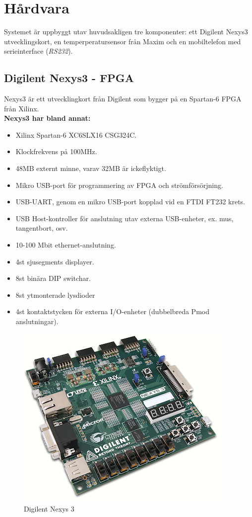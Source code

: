 \section{Hårdvara}\label{sec:hårdvara}
	Systemet är uppbyggt utav huvudsakligen tre komponenter: ett Digilent Nexys3 utvecklingskort, en
	temperperatursensor från Maxim och en mobiltelefon med serieinterface (\emph{RS232}).

	\subsection{Digilent Nexys3 - FPGA}
		Nexys3 är ett utvecklingkort från Digilent som bygger på en Spartan-6 FPGA från Xilinx.
		\\
		\textbf{Nexys3 har bland annat:}
		\begin{itemize}
			\item Xilinx Spartan-6 XC6SLX16 CSG324C.
			\item Klockfrekvens på 100MHz.
			\item 48MB externt minne, varav 32MB är ickeflyktigt.
			\item Mikro USB-port för programmering av FPGA och strömförsörjning.
			\item USB-UART, genom en mikro USB-port kopplad vid en FTDI FT232 krets.
			\item USB Host-kontroller för anslutning utav externa USB-enheter, ex. mus, tangentbort, osv.
			\item 10-100 Mbit ethernet-anslutning.
			\item 4st sjusegments displayer.
			\item 8st binära DIP switchar.
			\item 8st ytmonterade lysdioder
			\item 4st kontaktstycken för externa I/O-enheter (dubbelbreda Pmod anslutningar).
		\end{itemize}
		
\begin{figure}[htp]
	\centering
	\includegraphics[scale=0.8]{nexys3.jpg}
	\caption{Digilent Nexys 3}
\end{figure}
		
